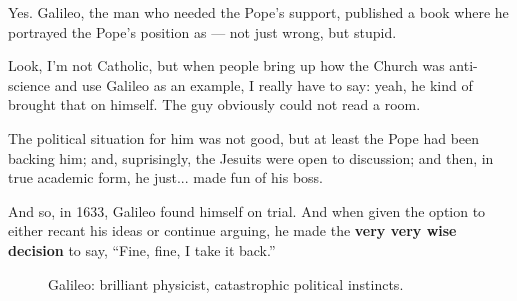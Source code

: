 Yes. Galileo, the man who needed the Pope’s support, published a book where he portrayed the Pope’s position as --- not just wrong, but stupid. 

Look, I’m not Catholic, but when people bring up how the Church was anti-science and use Galileo as an example, I really have to say: yeah, he kind of brought that on himself. The guy obviously could not read a room. 

The political situation for him was not good, but at least the Pope had been backing him; and, suprisingly, the Jesuits were open to discussion; and then, in true academic form, he just... made fun of his boss. 

And so, in 1633, Galileo found himself on trial. And when given the option to either recant his ideas or continue arguing, he made the \textbf{very very wise decision} to say, ``Fine, fine, I take it back.''




\begin{figure}[H]
\centering
{}
\caption{Galileo: brilliant physicist, catastrophic political instincts.}
\end{figure}

